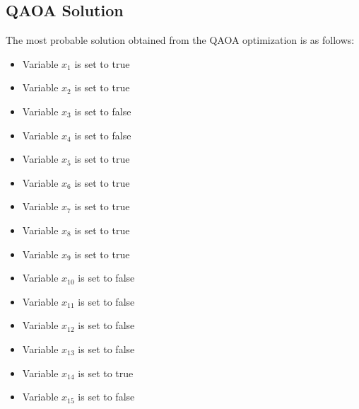 \documentclass{article}%
\begin{document}
%
\subsection{QAOA Solution}%
\label{subsec:QAOASolution}%
The most probable solution obtained from the QAOA optimization is as follows:\newline%
%
\begin{itemize}%
\item Variable \( x_1 \) is set to true%
\item Variable \( x_2 \) is set to true%
\item Variable \( x_3 \) is set to false%
\item Variable \( x_4 \) is set to false%
\item Variable \( x_5 \) is set to true%
\item Variable \( x_6 \) is set to true%
\item Variable \( x_7 \) is set to true%
\item Variable \( x_8 \) is set to true%
\item Variable \( x_9 \) is set to true%
\item Variable \( x_10 \) is set to false%
\item Variable \( x_11 \) is set to false%
\item Variable \( x_12 \) is set to false%
\item Variable \( x_13 \) is set to false%
\item Variable \( x_14 \) is set to true%
\item Variable \( x_15 \) is set to false%
\end{itemize}

%
\end{document}
